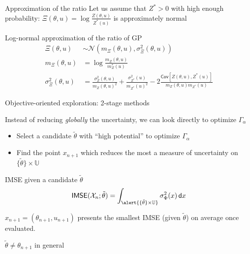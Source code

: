 \documentclass[10pt,aspectratio=169,usepdftitle=false]{beamer}
\newcommand{\Uspace}{\mathbb{U}}
\newcommand{\Cov}{\textsf{Cov}}
\newcommand{\kk}{\theta}
\newcommand{\uu}{u}
\begin{document}
\begin{frame}{Approximation of the ratio}
  Let us assume that $Z^*>0$ with high enough probability:
  $\Xi(\kk, \uu) = \log \frac{Z(\kk,\uu)}{Z^*(\uu)}$ is approximately normal
  \begin{block}{Log-normal approximation of the ratio of GP}
    \begin{align}
      \Xi(\kk, \uu) &\sim \mathcal{N}\left(m_\Xi(\kk,\uu), \sigma^2_\Xi(\kk, \uu) \right) \\
      m_\Xi(\kk, \uu) &= \log \frac{m_Z(\kk, \uu)}{m_Z^*(\uu)} \\
      \sigma^2_\Xi(\kk, \uu) &= \frac{\sigma^2_{Z}(\kk, \uu)}{m_{Z}(\kk,\uu)^2} + {\frac{\sigma^2_{Z^*}(\uu)}{m_{Z^*}(\uu)^2}} - 2 \frac{\Cov[Z(\kk, \uu), Z^*(\uu)]}{m_Z(\kk, \uu)m_{Z^*}(\uu)} 
    \end{align}
  \end{block}
\end{frame}


\begin{frame}{Objective-oriented exploration: 2-stage methods}
  
  Instead of reducing \emph{globally} the uncertainty, we can look directly to optimize $\Gamma_{\alpha}$
  \begin{itemize}
  \item Select a candidate $\tilde{\kk}$ with ``high potential'' to optimize $\Gamma_{\alpha}$
  \item Find the point $x_{n+1}$ which reduces the most a measure of uncertainty on $\{\tilde{\kk} \} \times \Uspace$
  \end{itemize}
  \begin{block}{IMSE given a candidate $\tilde{\kk}$}
  \begin{equation}
    \mathsf{IMSE}(\mathcal{X}_n; \tilde{\kk}) = \int_{\alert{\{\tilde{\kk}\}\times \Uspace}} \sigma^2_\Phi(x) \,\mathsf{d}x
  \end{equation}
\end{block}
$x_{n+1}=(\kk_{n+1}, \uu_{n+1})$ presents the smallest IMSE (given $\tilde{\kk}$) on average once evaluated.

$\tilde{\kk} \neq \kk_{n+1}$ in general
\end{frame}
\end{document}
